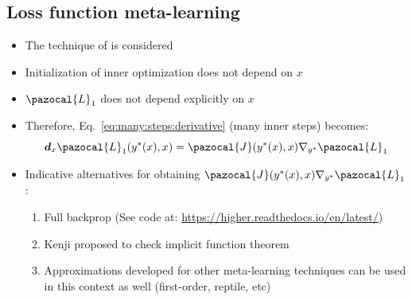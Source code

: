 \subsection{Loss function meta-learning}
\begin{itemize}
	\item The technique of \textcite{bechtle2020metalearning} is considered
	\item Initialization of inner optimization does not depend on $x$
	\item $\pazocal{L}_1$ does not depend explicitly on $x$
	\item Therefore, Eq.~\eqref{eq:many:steps:derivative} (many inner steps) becomes:
	\begin{equation}\label{}
		\boldsymbol{d}_x\pazocal{L}_1(y^*(x), x) = \pazocal{J}(y^*(x), x) \nabla_{y^*}\pazocal{L}_1 
	\end{equation}
	\item Indicative alternatives for obtaining $\pazocal{J}(y^*(x), x) \nabla_{y^*}\pazocal{L}_1 $: 
	\begin{enumerate}
		\item Full backprop (See code at: \href{https://higher.readthedocs.io/en/latest/}{https://higher.readthedocs.io/en/latest/})
		\item Kenji proposed to check implicit function theorem
		\item Approximations developed for other meta-learning techniques can be used in this context as well (first-order, reptile, etc)
	\end{enumerate}
\end{itemize}

